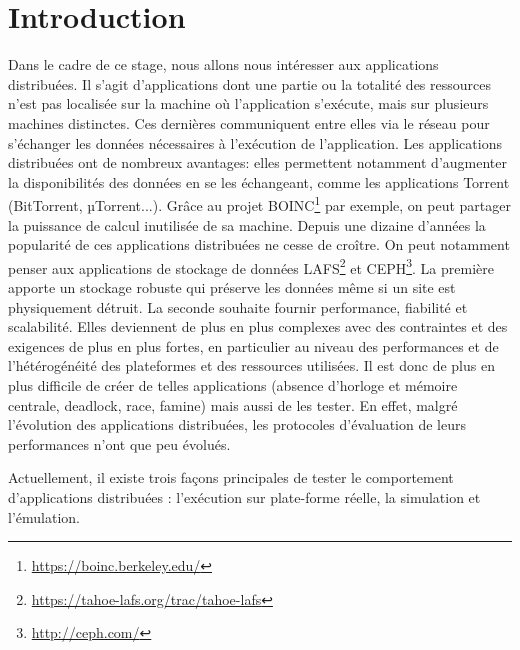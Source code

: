 \section{Introduction}



Dans le cadre de ce stage, nous allons nous intéresser aux applications
distribuées. Il s'agit d'applications dont une partie ou la totalité des
ressources n'est pas localisée sur la machine où l'application s'exécute, mais
sur plusieurs machines distinctes. Ces dernières communiquent entre elles via le
réseau pour s'échanger les données nécessaires à l'exécution de
l'application. Les applications distribuées ont de nombreux avantages: elles
permettent notamment d'augmenter la disponibilités des données en se les
échangeant, comme les applications Torrent (BitTorrent, $µ$Torrent...). Grâce au
projet BOINC\footnote{\url{https://boinc.berkeley.edu/}} par exemple, on peut
partager la puissance de calcul inutilisée de sa machine. Depuis une dizaine
d'années la popularité de ces applications distribuées ne cesse de croître. On
peut notamment penser aux applications de stockage de données
LAFS\footnote{\url{https://tahoe-lafs.org/trac/tahoe-lafs}} et
CEPH\footnote{\url{http://ceph.com/}}. La première apporte un stockage robuste
qui préserve les données même si un site est physiquement détruit. La seconde
souhaite fournir performance, fiabilité et scalabilité.  Elles deviennent de
plus en plus complexes avec des contraintes et des exigences de plus en plus
fortes, en particulier au niveau des performances et de l'hétérogénéité des
plateformes et des ressources utilisées. Il est donc de plus en plus
difficile de créer de telles applications (absence d'horloge et mémoire
centrale, deadlock, race, famine) mais aussi de les tester.  En effet, malgré
l'évolution des applications distribuées, les protocoles d'évaluation de leurs
performances n'ont que peu évolués.
\newline

Actuellement, il existe trois façons principales de tester le comportement
d'applications distribuées \citep{gustedt2009experimental}: l'exécution sur
plate-forme réelle, la simulation et l'émulation.

